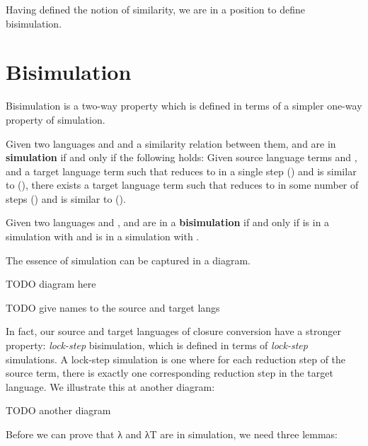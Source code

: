 Having defined the notion of similarity, we are in a position to
define bisimulation.

\section{Bisimulation}

Bisimulation is a two-way property which is defined in terms of a
simpler one-way property of simulation.

\begin{definition}{}
Given two languages  and  and a similarity relation
\AS{\_\textasciitilde\_}
between them,  and  are in \textbf{simulation} if and only
if the following holds:
Given source language terms  and , and a target language
term  such that  reduces to  in a single step () and
 is similar to  (), there exists a target
language term  such that  reduces to  in some
number of steps () and  is similar to  ().
\end{definition}

\begin{definition}
Given two languages  and ,   and  are in a
\textbf{bisimulation} if and only if  is in a simulation with  and
 is in a simulation with .
\end{definition}

The essence of simulation can be captured in a diagram.

TODO diagram here

TODO give names to the source and target langs

In fact, our source and target languages of closure conversion have a
stronger property: \textit{lock-step} bisimulation, which is defined
in terms of \textit{lock-step} simulations. A lock-step simulation is
one where for each reduction step of the source term, there is exactly
one corresponding reduction step in the target language. We illustrate
this at another diagram:

TODO another diagram

Before we can prove that λ and λT are in simulation, we need three
lemmas:

